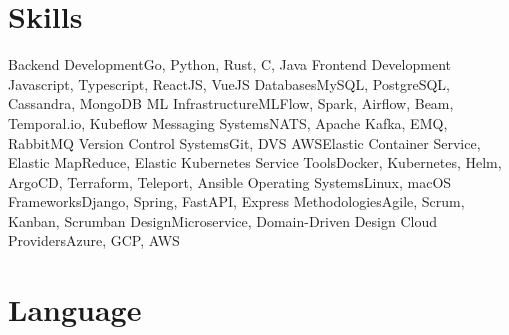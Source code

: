\section{Skills}

\cvline%
{Backend Development}{Go, Python, Rust, C, Java}
\cvline%
{Frontend Development}
{Javascript, Typescript, ReactJS, VueJS}
\cvline%
{Databases}{MySQL, PostgreSQL, Cassandra, MongoDB}
\cvline%
{ML Infrastructure}{MLFlow, Spark, Airflow, Beam, Temporal.io, Kubeflow}
\cvline%
{Messaging Systems}{NATS, Apache Kafka, EMQ, RabbitMQ}
\cvline%
{Version Control Systems}{Git, DVS}
\cvline%
{AWS}{Elastic Container Service, Elastic MapReduce, Elastic Kubernetes Service}
\cvline%
{Tools}{Docker, Kubernetes, Helm, ArgoCD, Terraform, Teleport, Ansible}
\cvline%
{Operating Systems}{Linux, macOS}
\cvline%
{Frameworks}{Django, Spring, FastAPI, Express}
\cvline%
{Methodologies}{Agile, Scrum, Kanban, Scrumban}
\cvline%
{Design}{Microservice, Domain-Driven Design}
\cvline%
{Cloud Providers}{Azure, GCP, AWS}

\section{Language}


\emptysection{}\closesection{}
